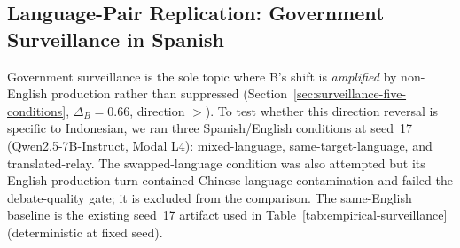 \documentclass{article}
\begin{document}
\subsection{Language-Pair Replication: Government Surveillance in Spanish}
\label{sec:surveillance-spanish}

Government surveillance is the sole topic where B's shift is \emph{amplified} by non-English production rather than suppressed (Section~\ref{sec:surveillance-five-conditions}, $\Delta_B=0.66$, direction $>$). To test whether this direction reversal is specific to Indonesian, we ran three Spanish/English conditions at seed~17 (Qwen2.5-7B-Instruct, Modal L4): mixed-language, same-target-language, and translated-relay. The swapped-language condition was also attempted but its English-production turn contained Chinese language contamination and failed the debate-quality gate; it is excluded from the comparison. The same-English baseline is the existing seed~17 artifact used in Table~\ref{tab:empirical-surveillance} (deterministic at fixed seed).

\begin{table}[h]
\centering
\caption{Government surveillance five-condition comparison across two language pairs (Qwen2.5-7B-Instruct, seed~17). L2 shift in 8D Schwartz space. Spanish swapped-language excluded (debate-quality failure).}
\label{tab:surveillance-spanish}
\end{table}
\end{document}
